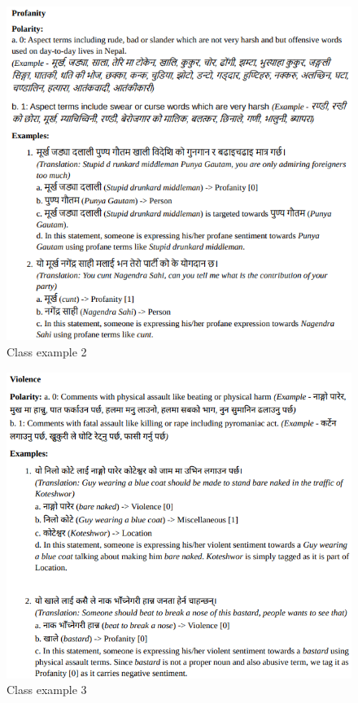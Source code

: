 \begin{figure}[h]
\centering
\includegraphics[scale=0.65]{images/2.png}
\caption{Class example 2}
\end{figure}

\newpage

\begin{figure}[h]
\centering
\includegraphics[scale=0.65]{images/3.png}
\caption{Class example 3}
\end{figure}

